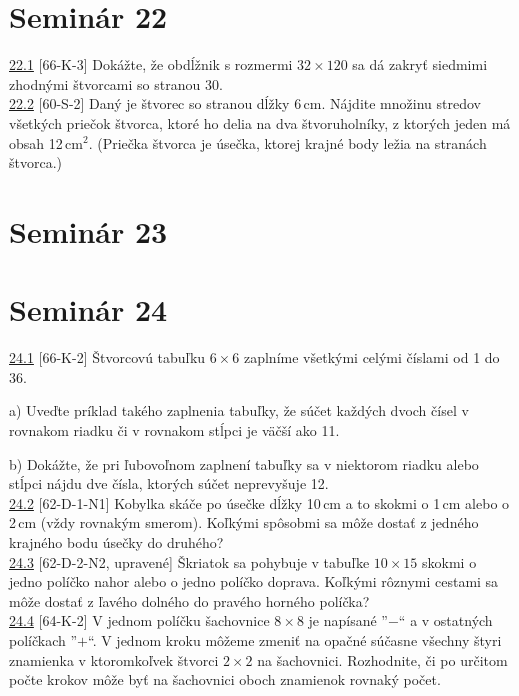 \section*{Seminár 22}

\noindent \ul{22.1} [66-K-3] Dokážte, že obdĺžnik s rozmermi $32 \times 120$ sa dá zakryť siedmimi zhodnými štvorcami so stranou 30.\\

\noindent \ul{22.2} [60-S-2]  Daný je štvorec so stranou dĺžky 6\,cm. Nájdite množinu stredov všetkých priečok štvorca, ktoré ho delia na dva štvoruholníky, z ktorých jeden má obsah 12\,cm$^2$. (Priečka štvorca je úsečka, ktorej krajné body ležia na stranách štvorca.)\\

\section*{Seminár 23}

\section*{Seminár 24}

\noindent \ul{24.1} [66-K-2]
Štvorcovú tabuľku $6\times 6$ zaplníme všetkými celými číslami od 1 do 36.

a) Uveďte príklad takého zaplnenia tabuľky, že súčet každých dvoch čísel v rovnakom riadku či v rovnakom stĺpci je väčší ako 11.

b) Dokážte, že pri ľubovoľnom zaplnení tabuľky sa v niektorom riadku alebo stĺpci nájdu dve čísla, ktorých súčet neprevyšuje 12.\\

\noindent \ul{24.2} [62-D-1-N1]
Kobylka skáče po úsečke dĺžky 10\,cm a to skokmi o 1\,cm alebo o 2\,cm (vždy rovnakým smerom). Koľkými spôsobmi sa môže dostať z jedného krajného bodu úsečky do druhého?\\

\noindent \ul{24.3} [62-D-2-N2, upravené] Škriatok sa pohybuje v tabuľke $10 \times 15$ skokmi o jedno políčko nahor alebo o jedno políčko doprava. Koľkými rôznymi cestami sa môže dostať z ľavého dolného do pravého horného políčka?\\

\noindent \ul{24.4} [64-K-2] V jednom políčku šachovnice $8 \times 8$ je napísané ”$-$“ a v ostatných políčkach ”$+$“. V jednom kroku môžeme zmeniť na opačné súčasne všechny štyri znamienka v ktoromkoľvek štvorci $2 \times 2$ na šachovnici. Rozhodnite, či po určitom počte krokov môže byť na šachovnici oboch znamienok rovnaký počet.\\

